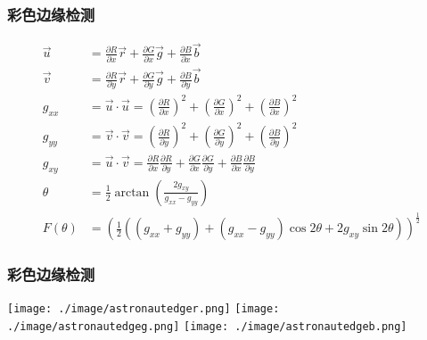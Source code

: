 \documentclass{beamer}
\begin{document}
\begin{frame}
\frametitle{彩色边缘检测}
\label{sec-7-4}

\begin{align*}
\vec{u} &= \frac{\partial R}{\partial x}\vec{r}+\frac{\partial G}{\partial x}\vec{g}+\frac{\partial B}{\partial x}\vec{b} \\
\vec{v} &= \frac{\partial R}{\partial y}\vec{r}+\frac{\partial G}{\partial y}\vec{g}+\frac{\partial B}{\partial y}\vec{b} \\
g_{xx} &= \vec{u}\cdot \vec{u}=\left(\frac{\partial R}{\partial x}\right)^2+\left(\frac{\partial G}{\partial x}\right)^2+\left(\frac{\partial B}{\partial x}\right)^2\\
g_{yy} &= \vec{v}\cdot \vec{v}=\left(\frac{\partial R}{\partial y}\right)^2+\left(\frac{\partial G}{\partial y}\right)^2+\left(\frac{\partial B}{\partial y}\right)^2\\
g_{xy} &= \vec{u}\cdot \vec{v}= \frac{\partial R}{\partial x}\frac{\partial R}{\partial y}+\frac{\partial G}{\partial x}\frac{\partial G}{\partial y}+\frac{\partial B}{\partial x}\frac{\partial B}{\partial y}\\
\theta &= \frac{1}{2}\arctan\left(\frac{2g_{xy}}{g_{xx}-g_{yy}}\right)\\
F(\theta) &=\left(\frac{1}{2}((g_{xx}+g_{yy})+(g_{xx}-g_{yy})\cos 2\theta +2g_{xy}\sin 2\theta)\right)^{\frac{1}{2}}
\end{align*}
\end{frame}
\begin{frame}
\frametitle{彩色边缘检测}
\label{sec-7-5}

\texttt{[image: ./image/astronautedger.png]}
\texttt{[image: ./image/astronautedgeg.png]}
\texttt{[image: ./image/astronautedgeb.png]}
\end{frame}
\end{document}
